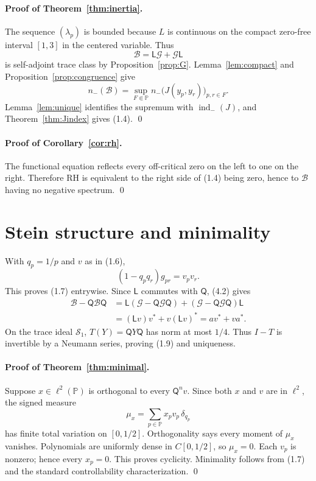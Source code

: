 \documentclass[11pt]{article}
\theoremstyle{definition}
\theoremstyle{remark}
\newcommand{\PP}{\mathbb P}
\newcommand{\cB}{\mathcal B}
\newcommand{\cG}{\mathcal G}
\newcommand{\cS}{\mathcal S}
\newcommand{\indm}{\operatorname{ind}_{-}}
\newcommand{\nm}{n_{-}}
\begin{document}
\paragraph{Proof of Theorem~\ref{thm:inertia}.}
The sequence $(\lambda_p)$ is bounded because $L$ is continuous on the compact zero-free interval
$[1,3]$ in the centered variable.  Thus
\begin{equation}
 \cB=\mathsf L\cG+\cG\mathsf L                             \tag{4.2}
\end{equation}
is self-adjoint trace class by Proposition~\ref{prop:G}.  Lemma~\ref{lem:compact} and
Proposition~\ref{prop:congruence} give
\[
 \nm(\cB)
 =\sup_{F\Subset\PP}\nm\bigl(J(y_p,y_r)\bigr)_{p,r\in F}.
\]
Lemma~\ref{lem:unique} identifies the supremum with $\indm(J)$, and
Theorem~\ref{thm:Jindex} gives (1.4). \qed

\paragraph{Proof of Corollary~\ref{cor:rh}.}
The functional equation reflects every off-critical zero on the left to one on the right.
Therefore RH is equivalent to the right side of (1.4) being zero, hence to $\cB$ having no
negative spectrum. \qed

\section{Stein structure and minimality}
\label{sec:stein}

With $q_p=1/p$ and $v$ as in (1.6),
\begin{equation}
 (1-q_pq_r)g_{pr}=v_pv_r.                                 \tag{5.1}
\end{equation}
This proves (1.7) entrywise.  Since $\mathsf L$ commutes with $\mathsf Q$, (4.2) gives
\[
 \begin{aligned}
 \cB-\mathsf Q\cB\mathsf Q
 &=\mathsf L(\cG-\mathsf Q\cG\mathsf Q)
   +(\cG-\mathsf Q\cG\mathsf Q)\mathsf L\\
 &=(\mathsf Lv)v^*+v(\mathsf Lv)^*
 =av^*+va^*.
 \end{aligned}
\]
On the trace ideal $\cS_1$, $T(Y)=\mathsf QY\mathsf Q$ has norm at most $1/4$.  Thus
$I-T$ is invertible by a Neumann series, proving (1.9) and uniqueness.

\paragraph{Proof of Theorem~\ref{thm:minimal}.}
Suppose $x\in\ell^2(\PP)$ is orthogonal to every $\mathsf Q^nv$.  Since both $x$ and $v$ are in
$\ell^2$, the signed measure
\[
 \mu_x=\sum_{p\in\PP}x_pv_p\,\delta_{q_p}
\]
has finite total variation on $[0,1/2]$.  Orthogonality says every moment of $\mu_x$ vanishes.
Polynomials are uniformly dense in $C[0,1/2]$, so $\mu_x=0$.  Each $v_p$ is nonzero; hence every
$x_p=0$.  This proves cyclicity.  Minimality follows from (1.7) and the standard controllability
characterization. \qed
\end{document}
